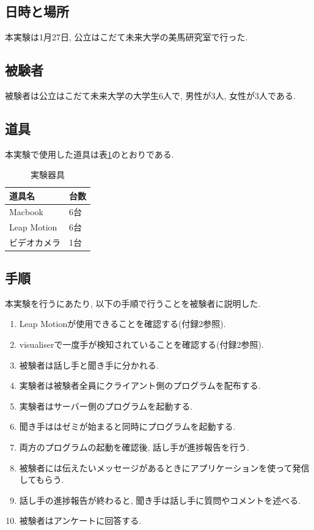 \documentclass{funthesis}
\begin{document}
\subsection{日時と場所}

本実験は1月27日, 公立はこだて未来大学の美馬研究室で行った. 

\subsection{被験者}
被験者は公立はこだて未来大学の大学生6人で, 男性が3人, 女性が3人である. 

\subsection{道具}
本実験で使用した道具は表\ref{tools}のとおりである. 

\begin{table}[H]
\begin{center}
\caption{実験器具}
  \begin{tabular}{ll}
   \hline
   道具名 & 台数\\
   \hline
   Macbook & 6台\\
   \hline
   Leap Motion & 6台\\ 
   \hline
  ビデオカメラ & 1台\\ 
   \hline
   \end{tabular}
   \label{tools}
  \end{center}
\end{table}


\subsection{手順}
本実験を行うにあたり, 以下の手順で行うことを被験者に説明した.  

\begin{enumerate}
 \item Leap Motionが使用できることを確認する(付録2参照).
 \item visualiserで一度手が検知されていることを確認する(付録2参照).
 \item 被験者は話し手と聞き手に分かれる. 
 \item 実験者は被験者全員にクライアント側のプログラムを配布する.
 \item 実験者はサーバー側のプログラムを起動する. 
 \item 聞き手ははゼミが始まると同時にプログラムを起動する. 
 \item 両方のプログラムの起動を確認後, 話し手が進捗報告を行う. 
 \item 被験者には伝えたいメッセージがあるときにアプリケーションを使って発信してもらう.
 \item 話し手の進捗報告が終わると, 聞き手は話し手に質問やコメントを述べる.
 \item 被験者はアンケートに回答する.
\end{enumerate}
\end{document}
